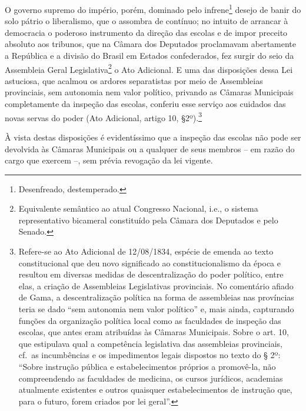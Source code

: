 O governo supremo do império, porém, dominado pelo infrene\footnote{
  Desenfreado, destemperado.} desejo de banir do solo pátrio o
liberalismo, que o assombra de contínuo; no intuito de arrancar à
democracia o poderoso instrumento da direção das escolas e de impor
preceito absoluto aos tribunos, que na Câmara dos Deputados proclamavam
abertamente a República e a divisão do Brasil em Estados confederados,
fez surgir do seio da Assembleia Geral Legislativa\footnote{Equivalente semântico ao atual 
Congresso Nacional, i.e., o sistema representativo bicameral constituído pela 
Câmara dos Deputados e pelo Senado.} o Ato Adicional. E uma das disposições 
dessa Lei astuciosa, que acalmou os ardores separatistas por meio de 
Assembleias provinciais, sem autonomia nem valor político, privando as 
Câmaras Municipais completamente da inspeção das escolas, conferiu esse 
serviço aos cuidados das novas servas do poder (Ato Adicional, artigo 10, 
§2º).\footnote{Refere-se ao Ato Adicional de 12/08/1834, espécie de
  emenda ao texto constitucional que deu novo significado ao
  constitucionalismo da época e resultou em diversas medidas de
  descentralização do poder político, entre elas, a criação de
  Assembleias Legislativas provinciais. No comentário afiado de Gama, a
  descentralização política na forma de assembleias nas províncias teria
  se dado ``sem autonomia nem valor político'' e, mais ainda, capturando
  funções da organização política local como as faculdades de inspeção
  das escolas, que antes eram atribuídas às Câmaras Municipais. Sobre o
  art. 10, que estipulava qual a competência legislativa das assembleias
  provinciais, cf.~as incumbências e os impedimentos legais dispostos no
  texto do § 2º: ``Sobre instrução pública e estabelecimentos próprios a
  promovê-la, não compreendendo as faculdades de medicina, os cursos
  jurídicos, academias atualmente existentes e outros quaisquer
  estabelecimentos de instrução que, para o futuro, forem criados por
  lei geral''.}

À vista destas disposições é evidentíssimo que a inspeção das escolas
não pode ser devolvida às Câmaras Municipais ou a qualquer de seus
membros -- em razão do cargo que exercem --, sem prévia revogação da lei
vigente.


